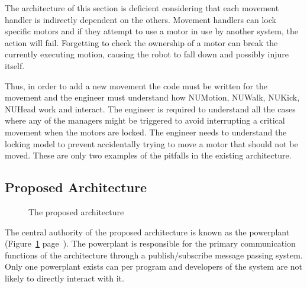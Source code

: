 \documentclass[english,12pt]{scrartcl}
\begin{document}
			The architecture of this section is deficient considering that each movement handler is indirectly dependent on the others.
			Movement handlers can lock specific motors and if they attempt to use a motor in use by another system, the action will fail.
			Forgetting to check the ownership of a motor can break the currently executing motion, causing the robot to fall down and possibly injure itself.

			Thus, in order to add a new movement the code must be written for the movement and the engineer must understand how NUMotion, NUWalk, NUKick, NUHead work and interact.
			The engineer is required to understand all the cases where any of the managers might be triggered to avoid interrupting a critical movement when the motors are locked.
			The engineer needs to understand the locking model to prevent accidentally trying to move a motor that should not be moved. These are only two examples of the pitfalls in the existing architecture.

		\subsection{Proposed Architecture}
			\begin{figure}[h]
				\centering
				\caption {The proposed architecture}
				\label{fig:HighLevelProposedArchitecture}
			\end{figure}

			The central authority of the proposed architecture is known as the \gls{powerplant} (Figure~\ref{fig:HighLevelProposedArchitecture} page~\pageref{fig:HighLevelProposedArchitecture}).
			The \gls{powerplant} is responsible for the primary communication functions of the architecture through a publish/subscribe message passing system.
			Only one \gls{powerplant} exists can per program and developers of the system are not likely to directly interact with it.
\end{document}
